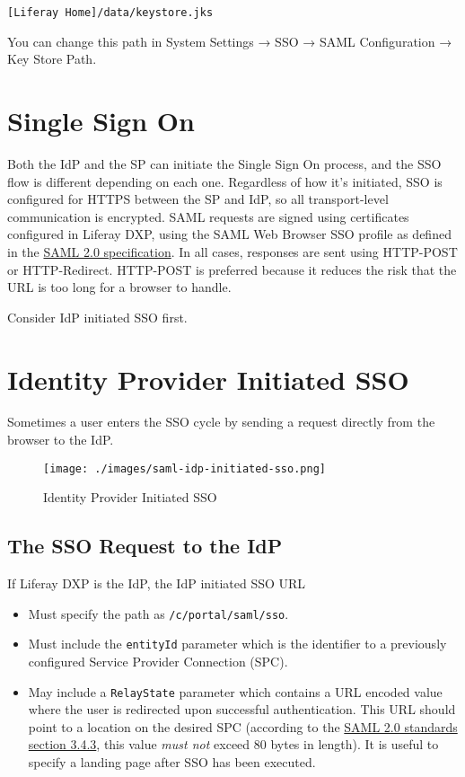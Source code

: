 \begin{verbatim}
[Liferay Home]/data/keystore.jks 
\end{verbatim}

You can change this path in System Settings → SSO → SAML Configuration →
Key Store Path.

\section{Single Sign On}\label{single-sign-on}

Both the IdP and the SP can initiate the Single Sign On process, and the
SSO flow is different depending on each one. Regardless of how it's
initiated, SSO is configured for HTTPS between the SP and IdP, so all
transport-level communication is encrypted. SAML requests are signed
using certificates configured in Liferay DXP, using the SAML Web Browser
SSO profile as defined in the
\href{http://saml.xml.org/saml-specifications}{SAML 2.0 specification}.
In all cases, responses are sent using HTTP-POST or HTTP-Redirect.
HTTP-POST is preferred because it reduces the risk that the URL is too
long for a browser to handle.

Consider IdP initiated SSO first.

\section{Identity Provider Initiated
SSO}\label{identity-provider-initiated-sso}

Sometimes a user enters the SSO cycle by sending a request directly from
the browser to the IdP.

\begin{figure}
\centering
\texttt{[image: ./images/saml-idp-initiated-sso.png]}
\caption{Identity Provider Initiated SSO}
\end{figure}

\subsection{The SSO Request to the
IdP}\label{the-sso-request-to-the-idp}

If Liferay DXP is the IdP, the IdP initiated SSO URL

\begin{itemize}
\tightlist
\item
  Must specify the path as \texttt{/c/portal/saml/sso}.
\item
  Must include the \texttt{entityId} parameter which is the identifier
  to a previously configured Service Provider Connection (SPC).
\item
  May include a \texttt{RelayState} parameter which contains a URL
  encoded value where the user is redirected upon successful
  authentication. This URL should point to a location on the desired SPC
  (according to the
  \href{https://docs.oasis-open.org/security/saml/v2.0/saml-bindings-2.0-os.pdf}{SAML
  2.0 standards section 3.4.3}, this value \emph{must not} exceed 80
  bytes in length). It is useful to specify a landing page after SSO has
  been executed.
\end{itemize}

